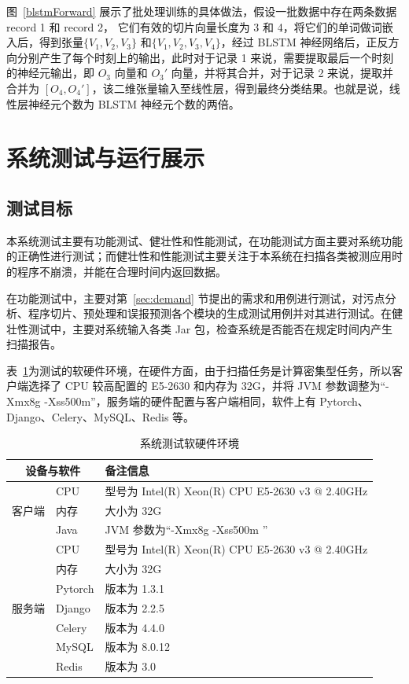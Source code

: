 图~\ref{blstmForward} 展示了批处理训练的具体做法，假设一批数据中存在两条数据 record 1 和 record 2， 它们有效的切片向量长度为 3 和 4，将它们的单词做词嵌入后，得到张量$\{V_{1},V_{2},V_{3}\}$ 和$\{V_{1},V_{2},V_{3},V_{4}\}$，经过 BLSTM 神经网络后，正反方向分别产生了每个时刻上的输出，此时对于记录 1 来说，需要提取最后一个时刻的神经元输出，即 $O_3$ 向量和 $O_3'$ 向量，并将其合并，对于记录 2 来说，提取并合并为 $\left[O_{4}, O_{4}'\right]$，该二维张量输入至线性层，得到最终分类结果。也就是说，线性层神经元个数为 BLSTM 神经元个数的两倍。

\section{系统测试与运行展示}
\subsection{测试目标}
本系统测试主要有功能测试、健壮性和性能测试，在功能测试方面主要对系统功能的正确性进行测试；而健壮性和性能测试主要关注于本系统在扫描各类被测应用时的程序不崩溃，并能在合理时间内返回数据。

在功能测试中，主要对第~\ref{sec:demand} 节提出的需求和用例进行测试，对污点分析、程序切片、预处理和误报预测各个模块的生成测试用例并对其进行测试。在健壮性测试中，主要对系统输入各类 Jar 包，检查系统是否能否在规定时间内产生扫描报告。

表~\ref{tab:testenv}为测试的软硬件环境，在硬件方面，由于扫描任务是计算密集型任务，所以客户端选择了 CPU 较高配置的 E5-2630 和内存为 32G，并将 JVM 参数调整为“-Xmx8g -Xss500m”，服务端的硬件配置与客户端相同，软件上有 Pytorch、Django、Celery、MySQL、Redis 等。

\begin{table}[!htbp]\footnotesize
    \centering
    \caption{系统测试软硬件环境}
    \begin{tabular}{cll}
        \toprule
        \multicolumn{2}{c}{设备与软件} & 备注信息 \\
        \midrule
        \multirow{3}[2]{*}{客户端} & CPU   & 型号为 Intel(R) Xeon(R) CPU E5-2630 v3 @ 2.40GHz \\
        & 内存    & 大小为 32G \\
        & Java  & JVM 参数为“-Xmx8g -Xss500m ”\\
        \midrule
        \multirow{7}[2]{*}{服务端} 
        & CPU   & 型号为 Intel(R) Xeon(R) CPU E5-2630 v3 @ 2.40GHz \\
        & 内存    & 大小为 32G \\
        & Pytorch & 版本为 1.3.1 \\
        & Django & 版本为 2.2.5 \\
        & Celery & 版本为 4.4.0 \\
        & MySQL & 版本为 8.0.12 \\
        & Redis & 版本为 3.0 \\
        \bottomrule
    \end{tabular}%
    \label{tab:testenv}%
\end{table}%


